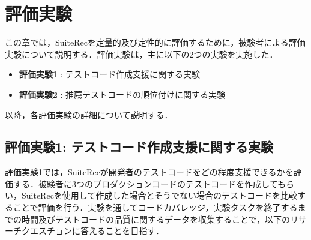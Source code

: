\documentclass[12pt]{jarticle} %
\begin{document}
\newpage
\section{評価実験}

この章では，{\sf SuiteRec}を定量的及び定性的に評価するために，被験者による評価実験について説明する．評価実験は，主に以下の2つの実験を実施した．

\begin{itemize}
\item \textbf{評価実験1} : テストコード作成支援に関する実験
\item \textbf{評価実験2} : 推薦テストコードの順位付けに関する実験
\end{itemize}

以降，各評価実験の詳細について説明する．

\subsection{評価実験1: テストコード作成支援に関する実験}
評価実験1では，{\sf SuiteRec}が開発者のテストコードをどの程度支援できるかを評価する．被験者に3つのプロダクションコードのテストコードを作成してもらい，{\sf SuiteRec}を使用して作成した場合とそうでない場合のテストコードを比較することで評価を行う．実験を通してコードカバレッジ，実験タスクを終了するまでの時間及びテストコードの品質に関するデータを収集することで，以下のリサーチクエスチョンに答えることを目指す．
\end{document}
